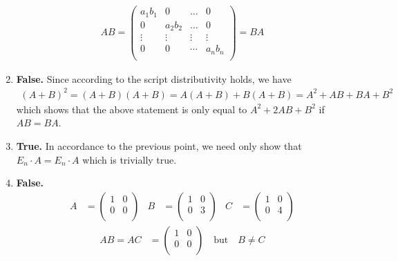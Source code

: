 \documentclass{article}
\begin{document}
\begin{enumerate}
    \begin{align*}
        AB = \begin{pmatrix}
            a_1b_1 & 0 & \ldots & 0 \\
            0 & a_2b_2 & \ldots & 0 \\
            \vdots & \vdots & \vdots & \vdots \\
            0 & 0 & \cdots & a_n b_n \\
        \end{pmatrix} = BA
    \end{align*}

    \item \textbf{False.} Since according to the script distributivity holds, we have 
    \begin{align*}
        (A + B)^2 = (A + B)(A + B) = A(A + B) + B(A + B) = A^2 + AB + BA + B^2
    \end{align*}
    which shows that the above statement is only equal to $A^2 + 2AB + B^2$ if $AB = BA$.

    \item \textbf{True.} In accordance to the previous point, we need only show that $E_n \cdot A = E_n \cdot A$ which is trivially true.
    
    \item \textbf{False.} \begin{align*}
        A &= \begin{pmatrix}
            1 & 0 \\ 0 & 0 \\
        \end{pmatrix} &
        B &= \begin{pmatrix}
            1 & 0 \\ 0 & 3 \\
        \end{pmatrix} &
        C &= \begin{pmatrix}
            1 & 0 \\ 0 & 4 \\
        \end{pmatrix}
    \end{align*}
    \begin{align*}
        AB = AC &= \begin{pmatrix}
            1 & 0 \\ 0 & 0 \\
        \end{pmatrix} \quad \text{but} \quad B \neq C
    \end{align*}
\end{enumerate}
\end{document}
